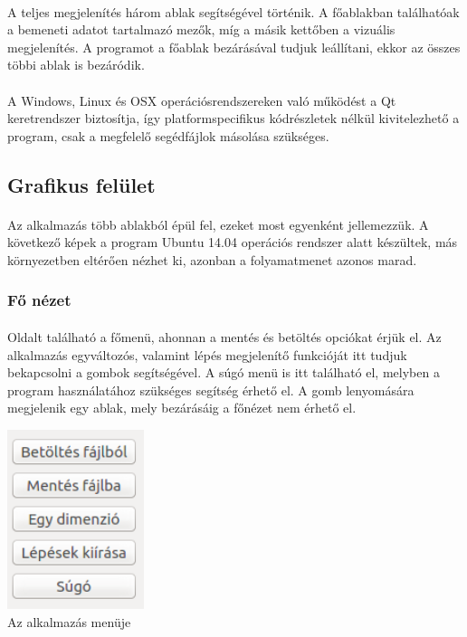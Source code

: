 \documentclass[12pt]{report}
\begin{document}
\paragraph{}
A teljes megjelenítés három ablak segítségével történik. A főablakban találhatóak a bemeneti adatot tartalmazó mezők, míg a másik kettőben a vizuális megjelenítés. A programot a főablak bezárásával tudjuk leállítani, ekkor az összes többi ablak is bezáródik.
\paragraph{}
A Windows, Linux és OSX operációsrendszereken való működést a Qt keretrendszer biztosítja, így platformspecifikus kódrészletek nélkül kivitelezhető a program, csak a megfelelő segédfájlok másolása szükséges.

\subsection{Grafikus felület}
\paragraph{}
Az alkalmazás több ablakból épül fel, ezeket most egyenként jellemezzük. A következő képek a program Ubuntu 14.04 operációs rendszer alatt készültek, más környezetben eltérően nézhet ki, azonban a folyamatmenet azonos marad.
\subsubsection{Fő nézet}
\paragraph{}
Oldalt található a főmenü, ahonnan a mentés és betöltés opciókat érjük el. Az alkalmazás egyváltozós, valamint lépés megjelenítő funkcióját itt tudjuk bekapcsolni a gombok segítségével. A súgó menü is itt található el, melyben a program használatához szükséges segítség érhető el. A gomb lenyomására megjelenik egy ablak, mely bezárásáig a főnézet nem érhető el.
\begin{center}
\includegraphics[width=4cm]{pics/gui/menu} \\
{\footnotesize Az alkalmazás menüje}
\end{center}
\end{document}
